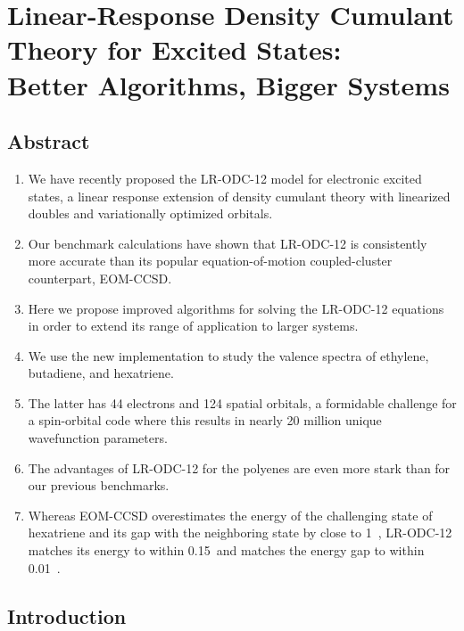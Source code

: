 \chapter[%
    Linear-Response Density Cumulant Theory for Excited States:\\
	Better Algorithms, Bigger Systems
]{%
    Linear-Response Density Cumulant Theory for Excited States:\\
	Better Algorithms, Bigger Systems
}
\label{ch:davidson}


\section{Abstract}

\begin{enumerate}
    \item
        We have recently proposed the LR-ODC-12 model for electronic excited
        states, a linear response extension of density cumulant theory with
        linearized doubles and variationally optimized orbitals.
    \item
        Our benchmark calculations have shown that LR-ODC-12 is consistently
        more accurate than its popular equation-of-motion coupled-cluster
        counterpart, EOM-CCSD.
    \item
        Here we propose improved algorithms for solving the LR-ODC-12 equations
        in order to extend its range of application to larger systems.
    \item
        We use the new implementation to study the valence spectra of ethylene,
        butadiene, and hexatriene.
    \item
        The latter has 44 electrons and 124 spatial orbitals, a formidable
        challenge for a spin-orbital code where this results in nearly 20
        million unique wavefunction parameters.
    \item
        The advantages of LR-ODC-12 for the polyenes are even more stark than
        for our previous benchmarks.
    \item
        Whereas EOM-CCSD overestimates the energy of the challenging
         state of hexatriene and its gap with the
        neighboring  state by close to 1~\eV, LR-ODC-12
        matches its energy to within 0.15~\eV and matches the energy gap to
        within 0.01~\eV.
\end{enumerate}


\section{Introduction}

